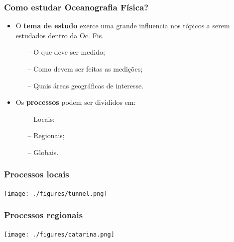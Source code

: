 \documentclass[14pt,xcolor=dvipsnames]{beamer}
\begin{document}
\begin{frame}
    \frametitle{Como estudar Oceanografia Física?}
    \begin{itemize}[<+-| alert@+>]
        \item O {\bf tema de estudo} exerce uma grande influencia nos tópicos a
              serem estudados dentro da Oc. Fis.
            \begin{enumerate}[<+-| alert@+>]
                \item[--]O que deve ser medido;
                \item[--]Como devem ser feitas as medições;
                \item[--]Quais áreas geográficas de interesse.
            \end{enumerate}
        \item Os {\bf processos} podem ser divididos em:
            \begin{enumerate}[<+-| alert@+>]
                \item[--]Locais;
                \item[--]Regionais;
                \item[--]Globais.
            \end{enumerate}
    \end{itemize}
\end{frame}

\begin{frame}
    \frametitle{Processos locais}
    \begin{center}
      \texttt{[image: ./figures/tunnel.png]}
    \end{center}
\end{frame}

\begin{frame}
    \frametitle{Processos regionais}
    \begin{center}
      \texttt{[image: ./figures/catarina.png]}
    \end{center}
\end{frame}
\end{document}
